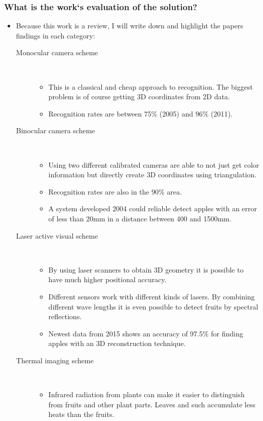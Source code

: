 \documentclass{article}
\begin{document}
\subsubsection*{What is the work`s evaluation of the solution?}
\begin{itemize}
    \item Because this work is a review, I will write down and highlight the papers findings in each category:
    \begin{description}
        \item[Monocular camera scheme] \ 
        \begin{itemize} 
            \item This is a classical and cheap approach to recognition. The biggest problem is of course getting 3D coordinates from 2D data.
            \item Recognition rates are between 75\% (2005) and 96\% (2011). 
         \end{itemize}
        \item[Binocular camera scheme] \ 
        \begin{itemize} 
            \item Using two different calibrated cameras are able to not just get color information but directly create 3D coordinates using triangulation.
            \item Recognition rates are also in the 90\% area. 
            \item A system developed 2004 could reliable detect apples with an error of  less than 20mm in a distance between 400 and 1500mm.
         \end{itemize}
        \item[Laser active visual scheme] \ 
        \begin{itemize} 
            \item By using laser scanners to obtain 3D geometry it is possible to have much higher positional accuracy.
            \item Different sensors work with different kinds of lasers. By combining different wave lengths it is even possible to detect fruits by spectral reflections.
            \item Newest data from 2015 shows an accuracy of 97.5\% for finding apples with an 3D reconstruction technique.
         \end{itemize}
        \item[Thermal imaging scheme] \ 
        \begin{itemize} 
            \item Infrared radiation from plants can make it easier to distinguish from fruits and other plant parts. Leaves and such accumulate less heats than the fruits.

\end{itemize}
\end{description}
\end{itemize}
\end{document}
